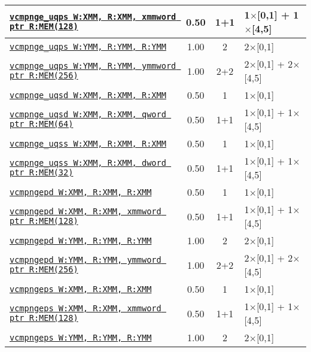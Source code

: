 \documentclass[a4paper,english,fontsize=9]{scrartcl}
\begin{document}
\begin{longtable}{p{}ccL{.25\textwidth}}
  \midrule
  \texttt{\href{https://felixcloutier.com/x86/CMPPS.html}{vcmpnge\_uqps W:XMM, R:XMM, xmmword ptr R:MEM(128)}} & 0.50 & 1+1 & 1\(\times\)[0,1] + 1\(\times\)[4,5] \\
  \midrule
  \texttt{\href{https://felixcloutier.com/x86/CMPPS.html}{vcmpnge\_uqps W:YMM, R:YMM, R:YMM}} & 1.00 & 2 & 2\(\times\)[0,1] \\
  \midrule
  \texttt{\href{https://felixcloutier.com/x86/CMPPS.html}{vcmpnge\_uqps W:YMM, R:YMM, ymmword ptr R:MEM(256)}} & 1.00 & 2+2 & 2\(\times\)[0,1] + 2\(\times\)[4,5] \\
  \midrule
  \texttt{\href{https://felixcloutier.com/x86/CMPSD.html}{vcmpnge\_uqsd W:XMM, R:XMM, R:XMM}} & 0.50 & 1 & 1\(\times\)[0,1] \\
  \midrule
  \texttt{\href{https://felixcloutier.com/x86/CMPSD.html}{vcmpnge\_uqsd W:XMM, R:XMM, qword ptr R:MEM(64)}} & 0.50 & 1+1 & 1\(\times\)[0,1] + 1\(\times\)[4,5] \\
  \midrule
  \texttt{\href{https://felixcloutier.com/x86/CMPSS.html}{vcmpnge\_uqss W:XMM, R:XMM, R:XMM}} & 0.50 & 1 & 1\(\times\)[0,1] \\
  \midrule
  \texttt{\href{https://felixcloutier.com/x86/CMPSS.html}{vcmpnge\_uqss W:XMM, R:XMM, dword ptr R:MEM(32)}} & 0.50 & 1+1 & 1\(\times\)[0,1] + 1\(\times\)[4,5] \\
  \midrule
  \texttt{\href{https://felixcloutier.com/x86/CMPPD.html}{vcmpngepd W:XMM, R:XMM, R:XMM}} & 0.50 & 1 & 1\(\times\)[0,1] \\
  \midrule
  \texttt{\href{https://felixcloutier.com/x86/CMPPD.html}{vcmpngepd W:XMM, R:XMM, xmmword ptr R:MEM(128)}} & 0.50 & 1+1 & 1\(\times\)[0,1] + 1\(\times\)[4,5] \\
  \midrule
  \texttt{\href{https://felixcloutier.com/x86/CMPPD.html}{vcmpngepd W:YMM, R:YMM, R:YMM}} & 1.00 & 2 & 2\(\times\)[0,1] \\
  \midrule
  \texttt{\href{https://felixcloutier.com/x86/CMPPD.html}{vcmpngepd W:YMM, R:YMM, ymmword ptr R:MEM(256)}} & 1.00 & 2+2 & 2\(\times\)[0,1] + 2\(\times\)[4,5] \\
  \midrule
  \texttt{\href{https://felixcloutier.com/x86/CMPPS.html}{vcmpngeps W:XMM, R:XMM, R:XMM}} & 0.50 & 1 & 1\(\times\)[0,1] \\
  \midrule
  \texttt{\href{https://felixcloutier.com/x86/CMPPS.html}{vcmpngeps W:XMM, R:XMM, xmmword ptr R:MEM(128)}} & 0.50 & 1+1 & 1\(\times\)[0,1] + 1\(\times\)[4,5] \\
  \midrule
  \texttt{\href{https://felixcloutier.com/x86/CMPPS.html}{vcmpngeps W:YMM, R:YMM, R:YMM}} & 1.00 & 2 & 2\(\times\)[0,1] \\

\end{longtable}
\end{document}
